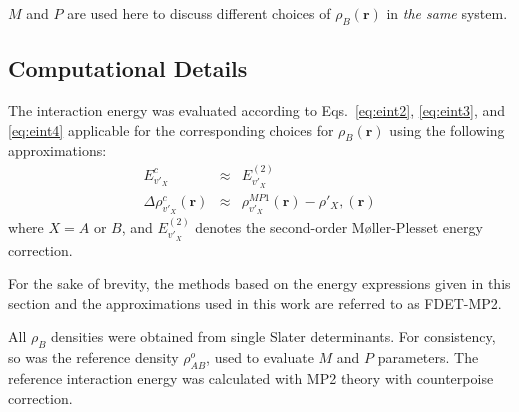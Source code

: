 \documentclass[amsmath,amssymb,preprint,aip,jcp]{revtex4-1}
\newcommand{\nr}[1]{\color{red}#1\color{black}}
\begin{document}
$M$ and $P$  are used here to discuss different choices of $\rho_{B}(\mathbf{r})$ in {\it the same} system. 
\subsection{Computational Details}
The interaction energy was evaluated according to Eqs.~\ref{eq:eint2}, \ref{eq:eint3}, and \ref{eq:eint4} applicable for the corresponding choices for $\rho_B(\mathbf{r})$ using the following approximations:
\begin{eqnarray}
E^{c}_{v'_X}&\approx&E_{v'_X}^{(2)} \label{eq:appr_ec}\\
\Delta \rho^{c}_{v'_X}(\mathbf{r})&\approx&\rho_{v'_X}^{MP1}(\mathbf{r})-\rho'_{X},(\mathbf{r}) \label{eq:appr_rc}
\end{eqnarray}
where $X=A$ or $B$, and $E_{v'_X}^{(2)}$ denotes the second-order M{\o}ller-Plesset energy correction.

For the sake of \nr{brevity}, the methods based on the energy expressions given in this section and \nr{the approximations used in this work } are referred to as FDET-MP2. 

All $\rho_B$ densities were obtained from single Slater determinants. For consistency, so was the reference density $\rho_{AB}^o$, used to evaluate $M$ and $P$ parameters.
The reference interaction energy was calculated with MP2 theory with counterpoise correction.
\end{document}
